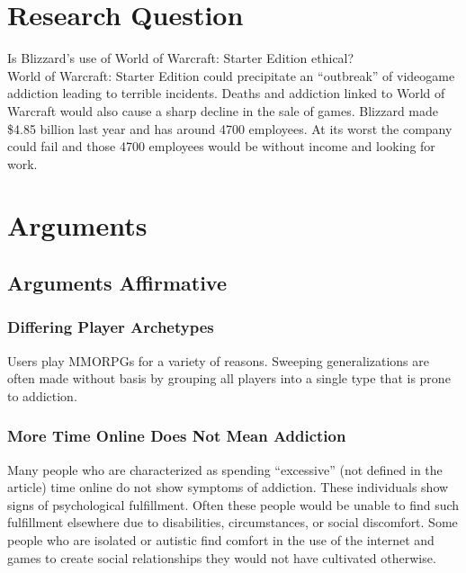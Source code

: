 \documentclass[11pt]{article}
\begin{document}
\begin{multicols}{2}
\section{Research Question}
Is Blizzard's use of World of Warcraft: Starter Edition ethical? \\

World of Warcraft: Starter Edition could precipitate an ``outbreak'' of videogame addiction leading to terrible incidents. \cite{SnowlyDeath} Deaths and addiction linked to World of Warcraft would also cause a sharp decline in the sale of games. Blizzard made \$4.85 billion last year and has around 4700 employees. \cite{BlizzardFinances} \cite{BlizzardEmployeeCount} At its worst the company could fail and those 4700 employees would be without income and looking for work.



\section{Arguments}
\subsection{Arguments Affirmative}
\subsubsection{Differing Player Archetypes}
Users play MMORPGs for a variety of reasons. Sweeping generalizations are often made without basis by grouping all players into a single type that is prone to addiction. \cite{PlayerMotivations}
\subsubsection{More Time Online Does Not Mean Addiction}
Many people who are characterized as spending ``excessive'' (not defined in the article) time online do not show symptoms of addiction. These individuals show signs of psychological fulfillment. Often these people would be unable to find such fulfillment elsewhere due to disabilities, circumstances, or social discomfort. Some people who are isolated or autistic find comfort in the use of the internet and games to create social relationships they would not have cultivated otherwise. \cite{IsThereEvidenceOfInternetAddiction}

\end{multicols}
\end{document}
